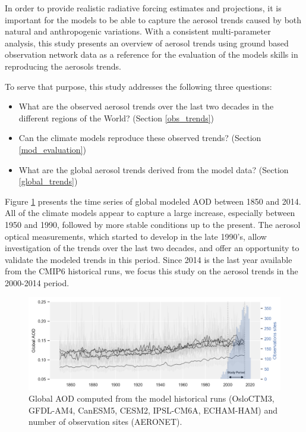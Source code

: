 \documentclass[journal abbreviation, manuscript]{copernicus}
\begin{document}
In order to provide realistic radiative forcing estimates and projections, it is important for the models to be able to capture the aerosol trends caused by both natural and anthropogenic variations. With a consistent multi-parameter analysis, this study presents an overview of aerosol trends using ground based observation network data as a reference for the evaluation of the models skills in reproducing the aerosols trends.

To serve that purpose, this study addresses the following three questions:
\begin{itemize}
    \item What are the observed aerosol trends over the last two decades in the different regions of the World? (Section \ref{obs_trends})
    \item Can the climate models reproduce these observed trends? (Section \ref{mod_evaluation})
    \item What are the global aerosol trends derived from the model data? (Section \ref{global_trends})
\end{itemize}

Figure \ref{fig:hist_runs} presents the time series of global modeled AOD between 1850 and 2014. All of the climate models appear to capture a large increase, especially between 1950 and 1990, followed by more stable conditions up to the present. The aerosol optical measurements, which started to develop in the late 1990's, allow investigation of the trends over the last two decades, and offer an opportunity to validate the modeled trends in this period. Since 2014 is the last year available from the CMIP6 historical runs, we focus this study on the aerosol trends in the 2000-2014 period.

\begin{figure}
 \centering
 \includegraphics[width=12cm]{../scripts/figs/hist_runs.png}
 \caption{Global AOD computed from the model historical runs (OsloCTM3, GFDL-AM4, CanESM5, CESM2, IPSL-CM6A, ECHAM-HAM) and number of observation sites (AERONET).}
 \label{fig:hist_runs}
\end{figure}
\end{document}
